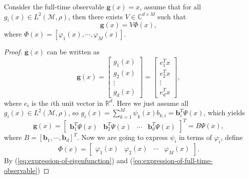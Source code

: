 \documentclass[en, bibend=bibtex]{elegantpaper}
\theoremstyle{plain}
\begin{document}
\begin{proposition}
  Consider the full-time observable $\mathbf{g}(x) = x$,
  assume that for all $g_i(x) \in L^2(\mathcal{M}, \rho)$,
  then there exists $V \in \mathbb{C}^{d \times M}$ such that
  \begin{equation*}
    \mathbf{g}(x) = V \Phi(x),
  \end{equation*}
  where $\Phi(x) = [\varphi_1(x),\cdots,\varphi_M(x)]$.
\end{proposition}

\begin{proof}
  $\mathbf{g}(x)$ can be written as
  \begin{equation*}
    \mathbf{g}(x) = \left[
      \begin{array}{c}
        g_1(x)\\
        g_2(x)\\
        \vdots\\
        g_d(x)
      \end{array}
    \right] = \left[
      \begin{array}{c}
        e^T_1x\\
        e^T_2x\\
        \vdots\\
        e^T_dx
      \end{array}
    \right],
  \end{equation*}
  where $e_i$ is the $i$th unit vector in $\mathbb{R}^d$.
  Here we just assume all $g_i(x) \in L^2(\mathcal{M}, \rho)$,
  so $g_i(x) = \sum\limits_{k = 1}^M \psi_k(x) b_{k,i} = \mathbf{b}_i^T \Psi(x)$,
  which yields
  \begin{equation}
    \label{eq:expression-of-full-time-observable}
    \mathbf{g}(x) = \left[
      \begin{array}{cccc}
        \mathbf{b}_1^T\Psi(x)&\mathbf{b}_2^T\Psi(x)&\cdots&\mathbf{b}_d^T\Psi(x)
      \end{array}
    \right]^T
    = B\Psi(x),
  \end{equation}
  where $B = [\mathbf{b}_1,\cdots,\mathbf{b}_d]^T$.
  Now we are going to express $\psi_i$ in terms of $\varphi_i$,
  define
  \begin{equation*}
    \Phi(x) = \left[
      \begin{array}{cccc}
        \varphi_1(x)&\varphi_2(x)&\cdots&\varphi_M(x)
      \end{array}
    \right].
  \end{equation*}
  By (\ref{eq:expression-of-eigenfunction})
  and (\ref{eq:expression-of-full-time-observable})

\end{proof}
\end{document}
